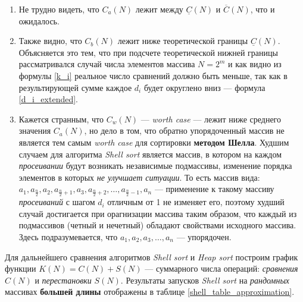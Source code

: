 \documentclass[a4paper,12pt,titlepage,finall]{article}
\begin{document}
\begin{enumerate}
\item
Не трудно видеть, что $C_a (N)$ лежит между $\underline{C} (N)$ и $\overline{C} (N)$, что и ожидалось. 

\item
Также видно, что $C_b (N)$ лежит ниже теоретической границы $\underline{C} (N)$. Объясняется это тем, что при подсчете теоретической нижней границы рассматривался случай числа элементов массива $N = 2^m$ и как видно из формулы \eqref{k_i} реальное число сравнений должно быть меньше, так как в результирующей сумме каждое $d_i$ будет округлено вниз — формула \eqref{d_i_extended}.

\item 
Кажется странным, что $C_w (N)$ — \textit{worth case} — лежит ниже среднего значения $C_a (N)$, но дело в том, что обратно упорядоченный массив не является тем самым \textit{worth case} для сортировки \textbf{методом Шелла}. Худшим случаем для алгоритма \textit{Shell sort} является массив, в котором на каждом \textit{просеивании} будут возникать независимые подмассивы, изменение порядка элементов в которых \textit{не улучшает ситуации}. То есть массив вида: $a_1, a_{\frac{n}{2}}, a_2, a_{\frac{n}{2} + 1}, a_3, a_{\frac{n}{2}+2}, \dots, a_{\frac{n}{2}-1}, a_n$ — применение к такому массиву  \textit{просеиваний} с шагом $d_i$ отличным от 1 не изменяет его, поэтому худший случай достигается при орагнизации массива таким образом, что каждый из подмассивов (четный и нечетный) обладают свойствами исходного массива. Здесь подразумевается, что $a_1, a_2, a_3, \dots, a_n$ — упорядочен.
\end{enumerate}


Для дальнейшего сравнения алгоритмов \textit{Shell sort} и \textit{Heap sort} построим график функции $K(N) = C(N) + S(N)$ — суммарного числа операций: \textit{сравнения} $C(N)$ и \textit{перестановки} $S(N)$. Результаты запусков \textit{Shell sort} на \textit{рандомных} массивах \textbf{большей длины} отображены в таблице \ref{shell_table_approximation}.\\
\end{document}
